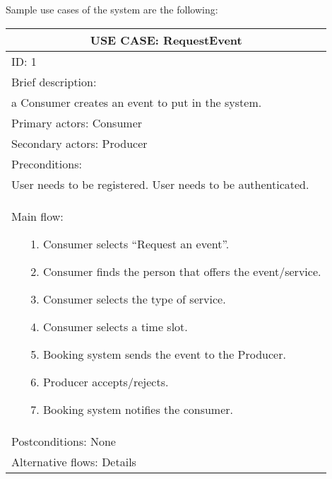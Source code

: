 \documentclass{article}
\begin{document}
Sample use cases of the system are the following:
\begin{table}[h!]
	\centering
	\begin{tabular}{|p{10cm}|}
		\hline
		\multicolumn{1}{|c|}{\textbf{USE CASE: RequestEvent}}\\
		\hline
		ID: 1\\
		\hline
		Brief description:\\a Consumer creates an event to put in the system.\\
		\hline
		Primary actors: Consumer \\
		\hline
		Secondary actors: Producer \\
		\hline
		Preconditions:\\User needs to be registered. User needs to be authenticated.\\
		\hline
		Main flow:
		\vspace{-0.5\baselineskip}
		\begin{itemize}[leftmargin=1.2em]
			\item[1.] Consumer selects “Request an event”.
			\vspace{-0.5\baselineskip}
			\item[2.] Consumer finds the person that offers the event/service.
			\vspace{-0.5\baselineskip}
			\item[3.] Consumer selects the type of service.
			\vspace{-0.5\baselineskip}
			\item[4.] Consumer selects a time slot.
			\vspace{-0.5\baselineskip}
			\item[5.] Booking system sends the event to the Producer.
			\vspace{-0.5\baselineskip}
			\item[6.] Producer accepts/rejects.
			\vspace{-0.5\baselineskip}
			\item[7.] Booking system notifies the consumer.
		\end{itemize}
		\vspace{-1.5\baselineskip}
		\\
		\hline
		Postconditions: None \\
		\hline
		Alternative flows: Details \\
		\hline
	\end{tabular}
\end{table}
\end{document}
